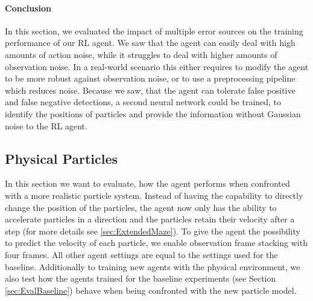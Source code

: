 \paragraph{Conclusion}
In this section, we evaluated the impact of multiple error sources on the training performance of our RL agent. We saw that the agent can easily deal with high amounts of action noise, while it struggles to deal with higher amounts of observation noise. In a real-world scenario this either requires to modify the agent to be more robust against observation noise, or to use a preprocessing pipeline which reduces noise. Because we saw, that the agent can tolerate false positive and false negative detections, a second neural network could be trained, to identify the positions of particles and provide the information without Gaussian noise to the RL agent.


\subsection{Physical Particles} \label{sec:EvalPhysical}
In this section we want to evaluate, how the agent performs when confronted with a more realistic particle system. Instead of having the capability to directly change the position of the particles, the agent now only has the ability to accelerate particles in a direction and the particles retain their velocity after a step (for more details see \ref{sec:ExtendedMaze}). To give the agent the possibility to predict the velocity of each particle, we enable observation frame stacking with four frames. All other agent settings are equal to the settings used for the baseline. Additionally to training new agents with the physical environment, we also test how the agents trained for the baseline experiments (see Section \ref{sec:EvalBaseline}) behave when being confronted with the new particle model.


